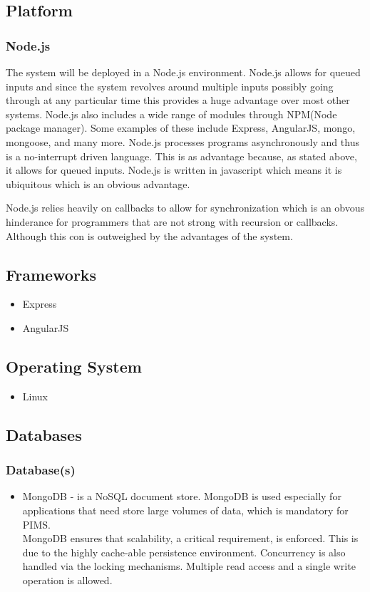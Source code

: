 \subsection{Platform}
\subsubsection{Node.js}
The system will be deployed in a Node.js environment. Node.js allows for queued inputs and since the system revolves around multiple inputs possibly going through at any particular time this provides a huge advantage over most other systems. Node.js also includes a wide range of modules through NPM(Node package manager). Some examples of these include Express, AngularJS, mongo, mongoose, and many more. Node.js processes programs asynchronously and thus is a no-interrupt driven language. This is as advantage because, as stated above, it allows for queued inputs. Node.js is written in javascript which means it is ubiquitous which is an obvious advantage.

Node.js relies heavily on callbacks to allow for synchronization which is an obvous hinderance for programmers that are not strong with recursion or callbacks. Although this con is outweighed by the advantages of the system.


\subsection{Frameworks}
\begin{itemize}
		\item Express
		\item AngularJS
\end{itemize}

\subsection{Operating System}
\begin{itemize}
		\item Linux
\end{itemize}
	
	
\subsection{Databases}
\subsubsection{Database(s)}
\begin{itemize}
	\item MongoDB - is a NoSQL document store. MongoDB is used especially for applications that need store large volumes of data, which is mandatory for PIMS. \\
	MongoDB ensures that scalability, a critical requirement, is enforced. This is due to the highly cache-able persistence environment. Concurrency is also handled  via the locking mechanisms. Multiple read access and a single write operation is allowed.
\end{itemize}
	

